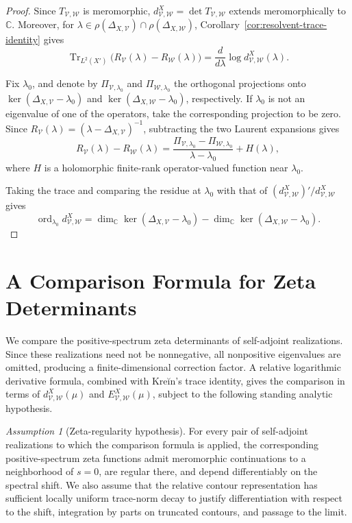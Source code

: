 \documentclass[12pt]{amsart}
\theoremstyle{plain}
\theoremstyle{definition}
\theoremstyle{remark}
\newtheorem{ass}[thm]{Assumption}
\numberwithin{equation}{section} \numberwithin{figure}{section}
\newcommand{\mb}[1]{\mathbb{#1}} %
\begin{document}
\begin{proof}
Since \(T_{\mathcal V,\mathcal W}\) is meromorphic,
\(
d_{\mathcal V,\mathcal W}^{X}
=
\det T_{\mathcal V,\mathcal W}
\)
extends meromorphically to \(\mb C\). Moreover, for
\(\lambda\in
\rho(\Delta_{X,\mathcal V})
\cap\rho(\Delta_{X,\mathcal W})\),
Corollary~\ref{cor:resolvent-trace-identity} gives
\[
\operatorname{Tr}_{L^2(X')}
\bigl(
R_{\mathcal V}(\lambda)-R_{\mathcal W}(\lambda)
\bigr)
=
\frac{d}{d\lambda}
\log d_{\mathcal V,\mathcal W}^{X}(\lambda).
\]

Fix \(\lambda_0\), and denote by
\(\Pi_{\mathcal V,\lambda_0}\) and
\(\Pi_{\mathcal W,\lambda_0}\) the orthogonal projections onto
\(\ker(\Delta_{X,\mathcal V}-\lambda_0)\) and
\(\ker(\Delta_{X,\mathcal W}-\lambda_0)\), respectively. If
\(\lambda_0\) is not an eigenvalue of one of the operators, take the
corresponding projection to be zero. Since
\(R_{\mathcal V}(\lambda)
=(\lambda-\Delta_{X,\mathcal V})^{-1}\), subtracting the two
Laurent expansions gives
\[
R_{\mathcal V}(\lambda)-R_{\mathcal W}(\lambda)
=
\frac{
\Pi_{\mathcal V,\lambda_0}
-
\Pi_{\mathcal W,\lambda_0}
}{
\lambda-\lambda_0
}
+
H(\lambda),
\]
where \(H\) is a holomorphic finite-rank operator-valued function
near \(\lambda_0\).

Taking the trace and comparing the residue at \(\lambda_0\) with
that of
\(
(d_{\mathcal V,\mathcal W}^{X})'/
d_{\mathcal V,\mathcal W}^{X}
\)
gives
\[
\operatorname{ord}_{\lambda_0}
d_{\mathcal V,\mathcal W}^{X}
=
\dim_{\mb C}\ker(\Delta_{X,\mathcal V}-\lambda_0)
-
\dim_{\mb C}\ker(\Delta_{X,\mathcal W}-\lambda_0).
\]
\end{proof}

\section{A Comparison Formula for Zeta Determinants}

We compare the positive-spectrum zeta determinants of self-adjoint
realizations. Since these realizations need not be nonnegative, all
nonpositive eigenvalues are omitted, producing a finite-dimensional
correction factor. A relative logarithmic derivative formula,
combined with Kreĭn's trace identity, gives the comparison in terms of
\(d_{\mathcal V,\mathcal W}^{X}(\mu)\) and
\(E_{\mathcal V,\mathcal W}^{X}(\mu)\), subject to the following
standing analytic hypothesis.

\begin{ass}[Zeta-regularity hypothesis]\label{ass:zeta-regularity}
For every pair of self-adjoint realizations to which the comparison
formula is applied, the corresponding positive-spectrum zeta functions admit
meromorphic continuations to a neighborhood of \(s=0\), are regular
there, and depend differentiably on the spectral shift. We also
assume that the relative contour representation has sufficient
locally uniform trace-norm decay to justify differentiation with
respect to the shift, integration by parts on truncated contours, and
passage to the limit.
\end{ass}
\end{document}
